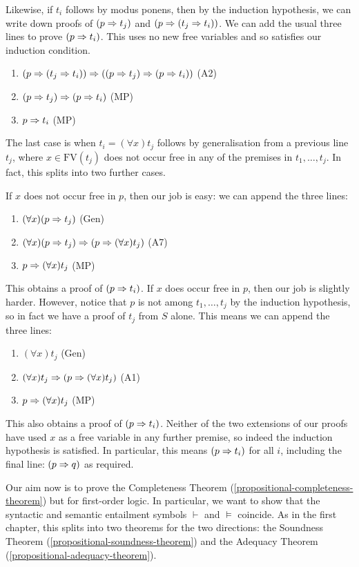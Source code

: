 \documentclass{article}
\begin{document}
\begin{prf}
    Likewise, if $t_i$ follows by modus ponens, then by the induction hypothesis, we can write down proofs of $(p \Rightarrow t_j)$ and $(p \Rightarrow (t_j \Rightarrow t_i))$. We can add the usual three lines to prove $(p \Rightarrow t_i)$. This uses no new free variables and so satisfies our induction condition.
	\begin{enumerate}
    	\item $(p \Rightarrow (t_j \Rightarrow t_i)) \Rightarrow ((p \Rightarrow t_j) \Rightarrow (p \Rightarrow t_i))$ \hfill (A2)
    	\item $(p \Rightarrow t_j) \Rightarrow (p \Rightarrow t_i)$ \hfill (MP)
    	\item $p \Rightarrow t_i$ \hfill (MP)
	\end{enumerate}
    The last case is when $t_i = (\forall x)t_j$ follows by generalisation from a previous line $t_j$, where $x \in \mathrm{FV}(t_j)$ does not occur free in any of the premises in $t_1, \dots, t_j$. In fact, this splits into two further cases.
    
    If $x$ does not occur free in $p$, then our job is easy: we can append the three lines:
    \begin{enumerate}
		\item $(\forall x)(p \Rightarrow t_j)$ \hfill (Gen)
		\item $(\forall x)(p \Rightarrow t_j) \Rightarrow (p \Rightarrow (\forall x)t_j)$ \hfill (A7)
		\item $p \Rightarrow (\forall x)t_j$ \hfill (MP)
	\end{enumerate}
	This obtains a proof of $(p \Rightarrow t_i)$. If $x$ does occur free in $p$, then our job is slightly harder. However, notice that $p$ is not among $t_1, \dots, t_j$ by the induction hypothesis, so in fact we have a proof of $t_j$ from $S$ alone. This means we can append the three lines:
	\begin{enumerate}
	    \item $(\forall x)t_j$ \hfill (Gen)
	    \item $(\forall x)t_j \Rightarrow (p \Rightarrow (\forall x)t_j)$ \hfill (A1)
	    \item $p \Rightarrow (\forall x)t_j$ \hfill(MP)
	\end{enumerate}
	This also obtains a proof of $(p \Rightarrow t_i)$. Neither of the two extensions of our proofs have used $x$ as a free variable in any further premise, so indeed the induction hypothesis is satisfied. In particular, this means $(p \Rightarrow t_i)$ for all $i$, including the final line: $(p \Rightarrow q)$ as required.
\end{prf}

Our aim now is to prove the Completeness Theorem (\ref{propositional-completeness-theorem}) but for first-order logic. In particular, we want to show that the syntactic and semantic entailment symbols $\vdash$ and $\vDash$ coincide. As in the first chapter, this splits into two theorems for the two directions: the Soundness Theorem (\ref{propositional-soundness-theorem}) and the Adequacy Theorem (\ref{propositional-adequacy-theorem}).
\end{document}
